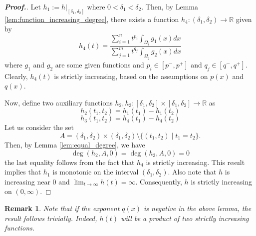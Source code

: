 \documentclass[11pt]{article}
\newtheorem{remark}{Remark}[section]
\begin{document}
\begin{proof}[\bf Proof.]
Let $h_1:= h|_{[\delta_1, \delta_2]}$
where $0 < \delta_1 < \delta_2.$
Then, by Lemma 
\ref{lem:function_increasing_degree}, 
there exists a function 
$h_4: (\delta_1, \delta_2) \to \mathbb{R}$
given by
\begin{equation*}
    h_4(t) = 
\frac{ \sum\limits_{i=1}^n t^{p_i} 
\int_{\Omega_i} g_1(x) dx}
{ \sum\limits_{j=1}^m t^{q_j} 
\int_{\Omega_j} g_2(x)dx}
\end{equation*}
where $g_1$
and $g_2$
are some given functions and $p_i \in [p^-,p^+]$
and $q_j \in [q^-,q^+]$.
Clearly, $h_4(t)$
is strictly increasing, based on the 
assumptions on $p(x)$
and $q(x)$.

Now, define two auxiliary functions 
$h_2, h_3 : [\delta_1, \delta_2] \times 
[\delta_1, \delta_2] \to \mathbb{R}$
as
\begin{equation*}
    h_2(t_1, t_2) = h_1(t_1) - h_1(t_2)
\end{equation*}
\begin{equation*}
    h_3(t_1, t_2) = h_4(t_1) - h_4(t_2)
\end{equation*}
Let us consider the set 
$$
A = (\delta_1, \delta_2) \times (\delta_1, \delta_2)
 \setminus \{ (t_1, t_2) \mid t_1 = t_2 \}.
 $$
Then, by Lemma \eqref{lem:equal_degree}, 
we have
\begin{equation*}
    \deg(h_2, A, 0) = \deg(h_3, A, 0) = 0
\end{equation*}
the last equality follows from the fact that 
$h_4$
is strictly increasing.
This result implies that $h_1$
is monotonic on the interval 
$(\delta_1, \delta_2).$
Also note that $h$
is increasing near $0$
and
$\lim_{t \to \infty} h(t) = \infty.$
Consequently, $h$
is strictly increasing on $(0, \infty)$.
\end{proof}

\begin{remark}\rm
    Note that if the exponent $q(x)$
is negative in the above lemma, 
the result follows trivially.
Indeed, $h(t)$
will be a product of two strictly 
increasing functions.
\end{remark}



 
\end{document}

